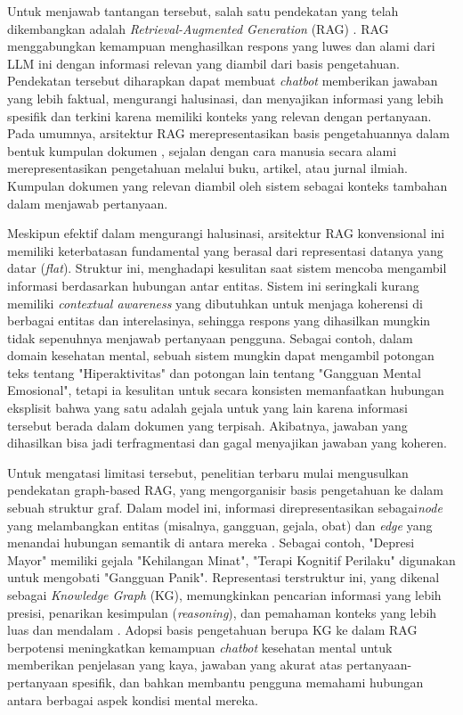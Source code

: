 Untuk menjawab tantangan tersebut, salah satu pendekatan yang telah dikembangkan adalah \textit{Retrieval-Augmented Generation} (RAG) \cite{Lewis2021RAGKnowledgeIntensiveNLP}.
RAG menggabungkan kemampuan menghasilkan respons yang luwes dan alami dari LLM ini dengan informasi relevan yang diambil dari basis pengetahuan.
Pendekatan tersebut diharapkan dapat membuat \textit{chatbot} memberikan jawaban yang lebih faktual, mengurangi halusinasi, dan menyajikan informasi yang lebih spesifik dan terkini karena memiliki konteks yang relevan dengan pertanyaan.
Pada umumnya, arsitektur RAG merepresentasikan basis pengetahuannya dalam bentuk kumpulan dokumen \cite{Lewis2021RAGKnowledgeIntensiveNLP}, sejalan dengan cara manusia secara alami merepresentasikan pengetahuan melalui buku, artikel, atau jurnal ilmiah.
Kumpulan dokumen yang relevan diambil oleh sistem sebagai konteks tambahan dalam menjawab pertanyaan.

Meskipun efektif dalam mengurangi halusinasi, arsitektur RAG konvensional ini memiliki keterbatasan fundamental yang berasal dari representasi datanya yang datar (\textit{flat}).
Struktur ini, menghadapi kesulitan saat sistem mencoba mengambil informasi berdasarkan hubungan antar entitas.
Sistem ini seringkali kurang memiliki \textit{ contextual awareness} yang dibutuhkan untuk menjaga koherensi di berbagai entitas dan interelasinya, sehingga respons yang dihasilkan mungkin tidak sepenuhnya menjawab pertanyaan pengguna.
Sebagai contoh, dalam domain kesehatan mental, sebuah sistem mungkin dapat mengambil potongan teks tentang "Hiperaktivitas" dan potongan lain tentang "Gangguan Mental Emosional", tetapi ia kesulitan untuk secara konsisten memanfaatkan hubungan eksplisit bahwa yang satu adalah gejala untuk yang lain karena informasi tersebut berada dalam dokumen yang terpisah.
Akibatnya, jawaban yang dihasilkan bisa jadi terfragmentasi dan gagal menyajikan jawaban yang koheren.

Untuk mengatasi limitasi tersebut, penelitian terbaru mulai mengusulkan pendekatan graph-based RAG, yang mengorganisir basis pengetahuan ke dalam sebuah struktur graf.
Dalam model ini, informasi direpresentasikan sebagai\textit{node} yang melambangkan entitas (misalnya, gangguan, gejala, obat) dan \textit{edge} yang menandai hubungan semantik di antara mereka \cite{Chen2020ReviewKnowldgeReasoningOverKnowledgeGraph}.
Sebagai contoh, "Depresi Mayor" memiliki gejala "Kehilangan Minat", "Terapi Kognitif Perilaku" digunakan untuk mengobati "Gangguan Panik".
Representasi terstruktur ini, yang dikenal sebagai \textit{Knowledge Graph} (KG), memungkinkan pencarian informasi yang lebih presisi, penarikan kesimpulan (\textit{reasoning}), dan pemahaman konteks yang lebih luas dan mendalam \cite{Chen2020ReviewKnowldgeReasoningOverKnowledgeGraph}.
Adopsi basis pengetahuan berupa KG ke dalam RAG berpotensi meningkatkan kemampuan \textit{chatbot} kesehatan mental untuk memberikan penjelasan yang kaya, jawaban yang akurat atas pertanyaan-pertanyaan spesifik, dan bahkan membantu pengguna memahami hubungan antara berbagai aspek kondisi mental mereka.

